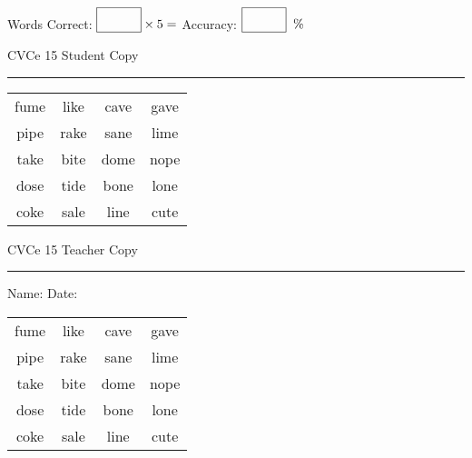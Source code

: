 \documentclass{memoir}
\begin{document}
\small

Words Correct: $\fbox{\phantom{\huge 100}} \times 5 = $ Accuracy: $\fbox{\phantom{\huge 100}}\;\; \%$ 

\vfill

\newpage


\footnotesize \noindent
CVCe 15 \hfill Student Copy
\smallskip
\hrule

\Large

\setlength{\tabcolsep}{14pt}
\def\arraystretch{2}

{\selectfont


\begin{vplace}[0.5]
\begin{center}
\begin{tabular}{cccc}
fume & like & cave & gave \\
pipe & rake & sane & lime \\
take & bite & dome & nope \\
dose & tide & bone & lone \\
coke & sale & line & cute \\
\end{tabular}
\end{center}
\end{vplace}

}

\newpage

\footnotesize \noindent
CVCe 15 \hfill Teacher Copy
\smallskip
\hrule

\small

\vfill

\noindent
Name: \underline{\hspace{1.75in}} \hfill Date: \underline{\hspace{1in}}

\Large

{\selectfont


\begin{vplace}[0.5]
\begin{center}
\begin{tabular}{cccc}
fume & like & cave & gave \\
pipe & rake & sane & lime \\
take & bite & dome & nope \\
dose & tide & bone & lone \\
coke & sale & line & cute \\
\end{tabular}
\end{center}
\end{vplace}



}
\end{document}
